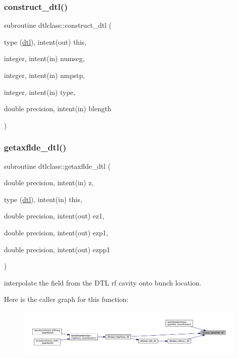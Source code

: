 \subsubsection{\texorpdfstring{construct\_dtl()}{construct\_dtl()}}
{\footnotesize\ttfamily subroutine dtlclass\+::construct\+\_\+dtl (\begin{DoxyParamCaption}\item[{type (\mbox{\hyperlink{namespacedtlclass_structdtlclass_1_1dtl}{dtl}}), intent(out)}]{this,  }\item[{integer, intent(in)}]{numseg,  }\item[{integer, intent(in)}]{nmpstp,  }\item[{integer, intent(in)}]{type,  }\item[{double precision, intent(in)}]{blength }\end{DoxyParamCaption})}

\mbox{\label{namespacedtlclass_a1fb756446dfd217cc32e4a9088e7f4c7}} 
\subsubsection{\texorpdfstring{getaxflde\_dtl()}{getaxflde\_dtl()}}
{\footnotesize\ttfamily subroutine dtlclass\+::getaxflde\+\_\+dtl (\begin{DoxyParamCaption}\item[{double precision, intent(in)}]{z,  }\item[{type (\mbox{\hyperlink{namespacedtlclass_structdtlclass_1_1dtl}{dtl}}), intent(in)}]{this,  }\item[{double precision, intent(out)}]{ez1,  }\item[{double precision, intent(out)}]{ezp1,  }\item[{double precision, intent(out)}]{ezpp1 }\end{DoxyParamCaption})}



interpolate the field from the D\+TL rf cavity onto bunch location. 

Here is the caller graph for this function\+:\nopagebreak
\begin{figure}[H]
\begin{center}
\leavevmode
\includegraphics[width=350pt]{namespacedtlclass_a1fb756446dfd217cc32e4a9088e7f4c7_icgraph}
\end{center}
\end{figure}
\mbox{\label{namespacedtlclass_a79f0618eb609338c97470f6f8f05a848}} 
